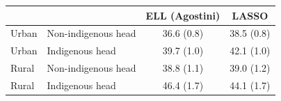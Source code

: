 \begin{tabular}{llcc}
\toprule
 & & ELL (Agostini) & LASSO \\
\midrule
Urban & Non-indigenous head & 36.6 (0.8) & 38.5 (0.8) \\
Urban & Indigenous head & 39.7 (1.0) & 42.1 (1.0) \\
Rural & Non-indigenous head & 38.8 (1.1) & 39.0 (1.2) \\
Rural & Indigenous head & 46.4 (1.7) & 44.1 (1.7) \\
\bottomrule
\end{tabular}
